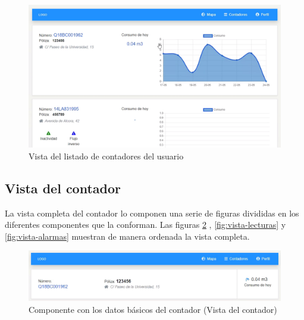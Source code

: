 \documentclass[pdftex,11pt,a4paper]{book}
\begin{document}
\begin{figure}[H]
 \centering
 \includegraphics [scale=0.52] {images/vistas/listado-contadores.png}
 \caption{Vista del listado de contadores del usuario} \label{fig:vista-lista-contadores}
 \end{figure}

\subsection{Vista del contador} \label{subseccion:vista-contador}

La vista completa del contador lo componen una serie de figuras divididas en los diferentes componentes que la conforman. Las figuras \ref{fig:vista-contador} , \ref{fig:vista-lecturas} y \ref{fig:vista-alarmas} muestran de manera ordenada la vista completa.


\begin{figure}[h]
 \centering
 \includegraphics [scale=0.53] {images/vistas/contador.png}
 \caption{Componente con los datos básicos del contador (Vista del contador)} \label{fig:vista-contador}
 \end{figure}
 
\end{document}
